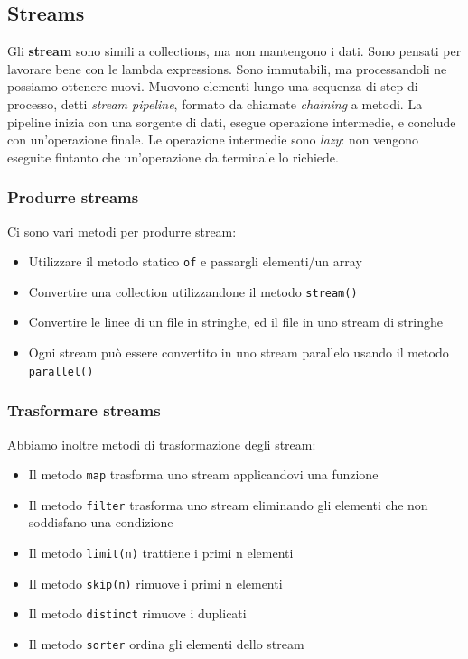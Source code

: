 \documentclass[11pt]{article}
\newcommand{\code}[1]{\texttt{#1}}
\begin{document}
\subsection{Streams}
Gli \textbf{stream} sono simili a collections, ma non mantengono i dati. Sono pensati per lavorare bene con le lambda expressions. Sono immutabili, ma processandoli ne possiamo ottenere nuovi. Muovono elementi lungo una sequenza di step di processo, detti \textit{stream pipeline}, formato da chiamate \textit{chaining} a metodi. La pipeline inizia con una sorgente di dati, esegue operazione intermedie, e conclude con un'operazione finale. Le operazione intermedie sono \textit{lazy}: non vengono eseguite fintanto che un'operazione da terminale lo richiede.
\subsubsection{Produrre streams}
Ci sono vari metodi per produrre stream:
\begin{itemize}
    \item Utilizzare il metodo statico \code{of} e passargli elementi/un array
    \item Convertire una collection utilizzandone il metodo \code{stream()}
    \item Convertire le linee di un file in stringhe, ed il file in uno stream di stringhe
    \item Ogni stream può essere convertito in uno stream parallelo usando il metodo \code{parallel()}
\end{itemize}
\subsubsection{Trasformare streams}
Abbiamo inoltre metodi di trasformazione degli stream:
\begin{itemize}
    \item Il metodo \code{map} trasforma uno stream applicandovi una funzione 
    \item Il metodo \code{filter} trasforma uno stream eliminando gli elementi che non soddisfano una condizione
    \item Il metodo \code{limit(n)} trattiene i primi n elementi
    \item Il metodo \code{skip(n)} rimuove i primi n elementi
    \item Il metodo \code{distinct} rimuove i duplicati 
    \item Il metodo \code{sorter} ordina gli elementi dello stream 
\end{itemize}
\end{document}

